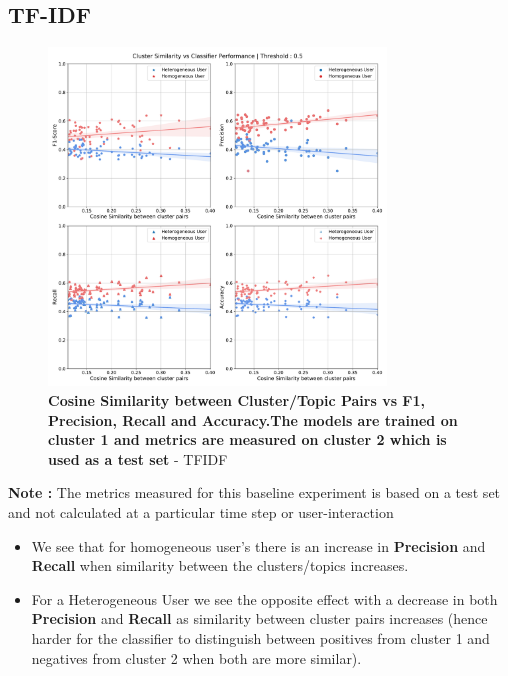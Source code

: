 \documentclass[a4paper,fontsize=8.0pt]{scrartcl}
\begin{document}
\subsection{TF-IDF}
\vspace{-5ex}
\begin{figure}[H]
 \centering
 \includegraphics[width=0.8\textwidth]{Graphs/TFIDF/cluster_sim_vs_model_perf_5.pdf}
 \caption{\textbf{Cosine Similarity between Cluster/Topic Pairs vs F1, Precision, Recall and Accuracy.The models are trained on cluster 1 and metrics are measured on cluster 2 which is used as a test set} - TFIDF}
\end{figure}
\begin{flushleft}
\textbf{Note :} The metrics measured for this baseline experiment is based on a test set and not calculated at a particular time step or user-interaction
\begin{itemize}
    \item We see that for homogeneous user's there is an increase in \textbf{Precision} and \textbf{Recall} when similarity between the clusters/topics increases.
    \item For a Heterogeneous User we see the opposite effect with a decrease in both \textbf{Precision} and \textbf{Recall} as similarity between cluster pairs increases (hence harder for the classifier to distinguish between positives from cluster 1 and negatives from cluster 2 when both are more similar).
\end{itemize}
\end{flushleft}
\end{document}
